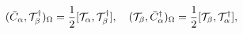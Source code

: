 \begin{equation}\label{5.23}
(\bar{C}_\alpha,{\cal T}^\dagger_\beta)_\Omega=\frac{1}{2}[{\cal T}_\alpha,
{\cal T}^\dagger_\beta],\quad
({\cal T}_\beta,\bar{C}^\dagger_\alpha)_\Omega=\frac{1}{2}
[{\cal T}_\beta,{\cal T}^\dagger_\alpha],
\end{equation}


